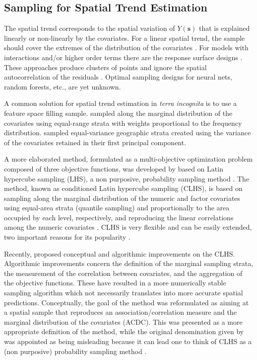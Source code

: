 \subsection{Sampling for Spatial Trend Estimation}

The spatial trend corresponds to the spatial variation of $Y(\boldsymbol{s})$ that is explained linearly or 
non-linearly by the covariates. For a linear spatial trend, the sample should cover the extremes of the 
distribution of the covariates \cite{Mueller2007}. For models with interactions and/or higher order terms there
are the response surface designs \cite{BoxEtAl1951, LeschEtAl1995}. These approaches produce clusters of points
and ignore the spatial autocorrelation of the residuals \cite{BrusEtAl2007a, Mueller2007}. Optimal sampling 
designs for neural nets, random forests, etc., are yet unknown.

A common solution for spatial trend estimation in \emph{terra incognita} is to use a feature space filling 
sample. \citet{HenglEtAl2003a} sampled along the marginal distribution of the covariates using equal-range 
strata with weights proportional to the frequency distribution. \citet{MinasnyEtAl2007a} sampled equal-variance
geographic strata created using the variance of the covariates retained in their first principal component.

A more elaborated method, formulated as a multi-objective optimization problem composed of three objective 
functions, was developed by \citet{MinasnyEtAl2006b} based on Latin hypercube sampling (LHS), a non purposive, 
probability sampling method \cite{McKayEtAl1979}. The method, known as conditioned Latin hypercube sampling 
(CLHS), is based on sampling along the marginal distribution of the numeric and factor covariates using 
equal-area strata (quantile sampling) and proportionally to the area occupied by each level, respectively, and 
reproducing the linear correlations among the numeric covariates \cite{MinasnyEtAl2006b}. CLHS is very flexible
and can be easily extended, two important reasons for its popularity \cite{MinasnyEtAl2010a, RoudierEtAl2012}.

Recently, \citet{Samuel-RosaEtAl2016} proposed conceptual and algorithmic improvements on the CLHS. Algorithmic
improvements concern the definition of the marginal sampling strata, the measurement of the correlation between
covariates, and the aggregation of the objective functions. These have resulted in a more numerically stable 
sampling algorithm which not necessarily translates into more accurate spatial predictions. Conceptually, the 
goal of the method was reformulated as aiming at a spatial sample that reproduces an association/correlation 
measure and the marginal distribution of the covariates (ACDC). This was presented as a more appropriate 
definition of the method, while the original denomination given by \citet{MinasnyEtAl2006b} was appointed as 
being misleading because it can lead one to think of CLHS as a (non purposive) probability sampling method 
\citet{Samuel-RosaEtAl2016}.

